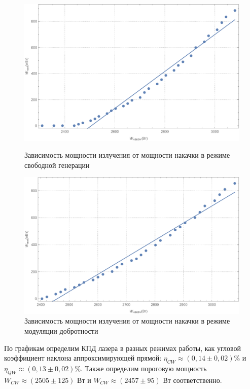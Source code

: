 \documentclass[a4paper, 12pt]{article}
\begin{document}
\begin{figure}[!h]
	\includegraphics[width=\textwidth]{1.pdf}
	\caption{Зависимость мощности излучения от мощности накачки в режиме свободной генерации}
	\endminipage
	\hfill
	\includegraphics[width=\textwidth]{2.pdf}
	\caption{Зависимость мощности излучения от мощности накачки в режиме модуляции добротности}
	\endminipage
\end{figure}
По графикам определим КПД лазера в разных режимах работы, как угловой коэффициент наклона аппроксимирующей прямой:
$ \eta_{CW} \approx (0,14 \pm 0,02)\% $ и 
$ \eta_{QW} \approx (0,13 \pm 0,02)\% $. Также определим пороговую мощность 
$ W_{CW} \approx (2505 \pm 125) $ Вт и 
$ W_{CW} \approx (2457 \pm 95) $ Вт соответственно.
\end{document}
